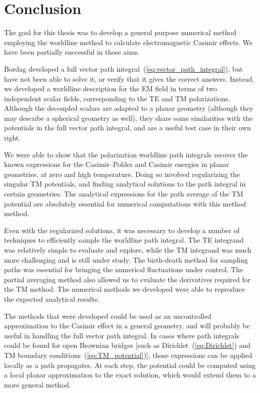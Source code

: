 \chapter{Conclusion}

The goal for this thesis was to develop a general purpose numerical method
employing the worldline method to calculate electromagnetic Casimir effects. 
We have been partially successful in those aims.   %

Bordag developed a full vector path integral~(\ref{eq:vector_path_integral}), but have not 
been able to solve it, or verify that it gives the correct answers.
Instead, we developed a worldline description for the EM field in terms of two independent scalar fields, corresponding 
to the TE and TM polarizations.   
Although the decoupled scalars are adapted to a planar geometry (although they may describe
a spherical geometry as well), they share some similarities with the potentials in the full vector
path integral, and are a useful test case in their own right.    

We were able to show that the polarization worldline path integrals recover the known expressions for the 
Casimir--Polder and Casimir energies in planar geometries, at zero and high temperature.  
Doing so involved regularizing the singular TM potentials, and finding analytical solutions to the path integral
in certain geometries.  The analytical expressions for the path average of the TM potential are 
absolutely essential for numerical computations with this method method.  

Even with the regularized solutions, it was necessary to develop a number of techniques to efficiently
sample the worldline path integral.  The TE integrand was relatively simple to evaluate and explore, while the TM
integrand was much more challenging and is still under study.
The birth-death method for sampling paths was essential for bringing the numerical fluctuations under control.
The partial averaging method also allowed us to evaluate the derivatives required for the TM method.
The numerical methods we developed were able to reproduce the expected analytical results.

The methods that were developed could be used as an uncontrolled approximation to the Casimir effect in a general geometry.
and will probably be useful in handling the full vector path integral.    
In cases where path integrals could be found for open Brownian bridges [such as
Dirichlet~(\ref{eq:Dirichlet}) and TM boundary conditions~(\ref{eq:TM_potential})], 
those expressions can be applied locally as a path propagates.  
At each step, the potential could be computed using a local planar approximation to the exact solution,
which would extend them to a more general method.  

